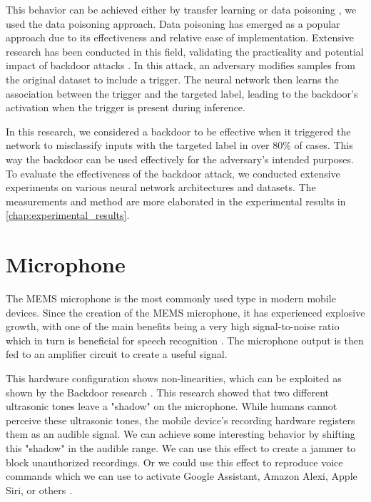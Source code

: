 \documentclass{report}
\theoremstyle{definition}
\theoremstyle{remark}
\begin{document}
This behavior can be achieved either by transfer learning \cite{LATENTBACKDOORS} or data poisoning \cite{OVERVIEWBACKDOOR}, we used the data poisoning approach. Data poisoning has emerged as a popular approach due to its effectiveness and relative ease of implementation. Extensive research has been conducted in this field, validating the practicality and potential impact of backdoor attacks \cite{CYHI} \cite{BACKDOORCOMPARE} \cite{BADNETS}. In this attack, an adversary modifies samples from the original dataset to include a  trigger.  The neural network then learns the association between the trigger and the targeted label, leading to the backdoor's activation when the trigger is present during inference.

In this research, we considered a backdoor to be effective when it triggered the network to misclassify inputs with the targeted label in over 80\% of cases. This way the backdoor can be used effectively for the adversary's intended purposes. To evaluate the effectiveness of the backdoor attack, we conducted extensive experiments on various neural network architectures and datasets. The measurements and method are more elaborated in the experimental results in \autoref{chap:experimental_results}. 


\section{Microphone}
The MEMS microphone is the most commonly used type in modern mobile devices. Since the creation of the MEMS microphone, it has experienced explosive growth, with one of the main benefits being a very high signal-to-noise ratio which in turn is beneficial for speech recognition \cite{7180939}. The microphone output is then fed to an amplifier circuit to create a useful signal.

This hardware configuration shows non-linearities, which can be exploited as shown by the Backdoor research \cite{BACKDOORMEMS}. This research showed that two different ultrasonic tones leave a "shadow" on the microphone. While humans cannot perceive these ultrasonic tones, the mobile device's recording hardware registers them as an audible signal. We can achieve some interesting behavior by shifting this "shadow" in the audible range. We can use this effect to create a jammer \cite{JAMMER} to block unauthorized recordings. Or we could use this effect to reproduce voice commands which we can use to activate Google Assistant,  Amazon Alexi, Apple Siri, or others \cite{POSTER} \cite{DOLPHIN}.
\end{document}
